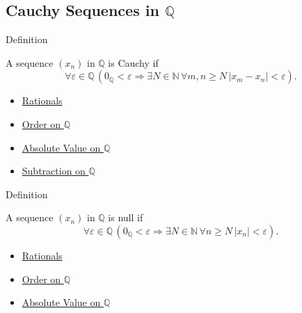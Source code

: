 \subsection*{\texorpdfstring{Cauchy Sequences in $\mathbb{Q}$}{Cauchy Sequences in Q}}

\begin{definitionbox}{Definition}
\begin{definition}
\label{def:cauchy-sequence-in-q}
A sequence $(x_n)$ in $\mathbb{Q}$ is Cauchy if
\[
\forall\varepsilon\in\mathbb{Q}\,
\left(
0_{\mathbb{Q}}<\varepsilon
\Longrightarrow
\exists N\in\mathbb{N}\,
\forall m,n\ge N\,
\left|x_m-x_n\right|<\varepsilon
\right).
\]
\end{definition}
\end{definitionbox}

\begin{dependencies}
\begin{itemize}
  \item \hyperref[def:rationals]{Rationals}
  \item \hyperref[def:order-on-q]{Order on $\mathbb{Q}$}
  \item \hyperref[def:absolute-value-on-q]{Absolute Value on $\mathbb{Q}$}
  \item \hyperref[def:subtraction-on-q]{Subtraction on $\mathbb{Q}$}
\end{itemize}
\end{dependencies}

\begin{definitionbox}{Definition}
\begin{definition}
\label{def:null-sequence-in-q}
A sequence $(x_n)$ in $\mathbb{Q}$ is null if
\[
\forall\varepsilon\in\mathbb{Q}\,
\left(
0_{\mathbb{Q}}<\varepsilon
\Longrightarrow
\exists N\in\mathbb{N}\,
\forall n\ge N\,
\left|x_n\right|<\varepsilon
\right).
\]
\end{definition}
\end{definitionbox}

\begin{dependencies}
\begin{itemize}
  \item \hyperref[def:rationals]{Rationals}
  \item \hyperref[def:order-on-q]{Order on $\mathbb{Q}$}
  \item \hyperref[def:absolute-value-on-q]{Absolute Value on $\mathbb{Q}$}
\end{itemize}
\end{dependencies}

